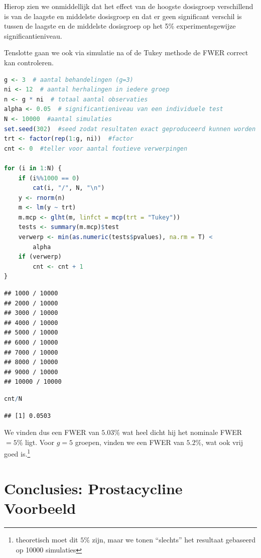 \documentclass[
  12pt,dutch,coursenotes]{book}
\theoremstyle{definition}
\theoremstyle{definition}
\theoremstyle{definition}
\theoremstyle{definition}
\theoremstyle{remark}
\begin{document}
Hierop zien we onmiddellijk dat het effect van de hoogste dosisgroep verschillend is van de laagste en middelste dosisgroep en dat er geen significant verschil is tussen de laagste en de middelste dosisgroep op het 5\% experimentsgewijze significantieniveau.

Tenslotte gaan we ook via simulatie na of de Tukey methode de FWER correct kan controleren.

\begin{lstlisting}[language=R]
g <- 3  # aantal behandelingen (g=3)
ni <- 12  # aantal herhalingen in iedere groep
n <- g * ni  # totaal aantal observaties
alpha <- 0.05  # significantieniveau van een individuele test
N <- 10000  #aantal simulaties
set.seed(302)  #seed zodat resultaten exact geproduceerd kunnen worden
trt <- factor(rep(1:g, ni))  #factor
cnt <- 0  #teller voor aantal foutieve verwerpingen

for (i in 1:N) {
    if (i%%1000 == 0)
        cat(i, "/", N, "\n")
    y <- rnorm(n)
    m <- lm(y ~ trt)
    m.mcp <- glht(m, linfct = mcp(trt = "Tukey"))
    tests <- summary(m.mcp)$test
    verwerp <- min(as.numeric(tests$pvalues), na.rm = T) <
        alpha
    if (verwerp)
        cnt <- cnt + 1
}
\end{lstlisting}

\begin{lstlisting}
## 1000 / 10000 
## 2000 / 10000 
## 3000 / 10000 
## 4000 / 10000 
## 5000 / 10000 
## 6000 / 10000 
## 7000 / 10000 
## 8000 / 10000 
## 9000 / 10000 
## 10000 / 10000
\end{lstlisting}

\begin{lstlisting}[language=R]
cnt/N
\end{lstlisting}

\begin{lstlisting}
## [1] 0.0503
\end{lstlisting}

We vinden dus een FWER van \(5.03\%\) wat heel dicht hij het nominale FWER\(=5\%\) ligt.
Voor \(g=5\) groepen, vinden we een FWER van \(5.2\%\), wat ook vrij goed is.\footnote{theoretisch moet dit \(5\%\) zijn, maar we tonen ``slechts'' het resultaat gebaseerd op 10000 simulaties}

\hypertarget{conclusies-prostacycline-voorbeeld}{%
\section{Conclusies: Prostacycline Voorbeeld}\label{conclusies-prostacycline-voorbeeld}}
\end{document}
